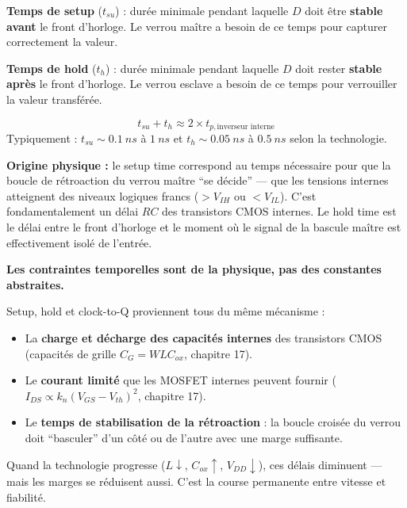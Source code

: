 \documentclass[12pt,a4paper,twoside]{book}
\begin{document}
\begin{formule}
\textbf{Temps de setup} ($t_{su}$) : durée minimale pendant laquelle $D$ doit être \textbf{stable avant} le front d'horloge. Le verrou maître a besoin de ce temps pour capturer correctement la valeur.

\textbf{Temps de hold} ($t_h$) : durée minimale pendant laquelle $D$ doit rester \textbf{stable après} le front d'horloge. Le verrou esclave a besoin de ce temps pour verrouiller la valeur transférée.

\[
\boxed{t_{su} + t_h \approx 2 \times t_{p,\text{inverseur interne}}}
\]
Typiquement : $t_{su} \sim \SI{0.1}{ns}$ à $\SI{1}{ns}$ et $t_h \sim \SI{0.05}{ns}$ à $\SI{0.5}{ns}$ selon la technologie.
\end{formule}

\begin{intuition}
\textbf{Origine physique :} le setup time correspond au temps nécessaire pour que la boucle de rétroaction du verrou maître ``se décide'' --- que les tensions internes atteignent des niveaux logiques francs ($> V_{IH}$ ou $< V_{IL}$). C'est fondamentalement un délai $RC$ des transistors CMOS internes. Le hold time est le délai entre le front d'horloge et le moment où le signal de la bascule maître est effectivement isolé de l'entrée.
\end{intuition}

\begin{formule}
\textbf{Les contraintes temporelles sont de la physique, pas des constantes abstraites.}

Setup, hold et clock-to-Q proviennent tous du même mécanisme :
\begin{itemize}[nosep]
\item La \textbf{charge et décharge des capacités internes} des transistors CMOS (capacités de grille $C_G = W L C_{ox}$, chapitre 17).
\item Le \textbf{courant limité} que les MOSFET internes peuvent fournir ($I_{DS} \propto k_n (V_{GS}-V_{th})^2$, chapitre 17).
\item Le \textbf{temps de stabilisation de la rétroaction} : la boucle croisée du verrou doit ``basculer'' d'un côté ou de l'autre avec une marge suffisante.
\end{itemize}
Quand la technologie progresse ($L \downarrow$, $C_{ox} \uparrow$, $V_{DD} \downarrow$), ces délais diminuent --- mais les marges se réduisent aussi. C'est la course permanente entre vitesse et fiabilité.
\end{formule}
\end{document}
